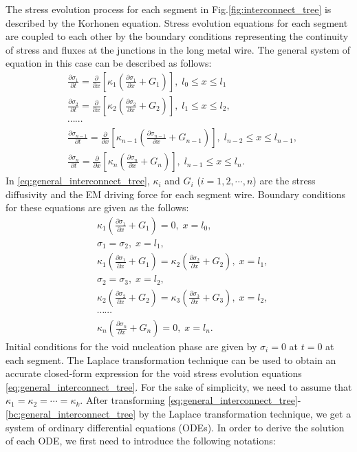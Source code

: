 The stress evolution process for each segment in Fig.\ref{fig:interconnect_tree} is described by the Korhonen equation. Stress evolution equations for each segment are coupled to each other by the boundary conditions representing the continuity of stress and fluxes at the junctions in the long metal wire. The general system of equation in this case can be described as follows:
\begin{equation} \label{eq:general_interconnect_tree}
\begin{split}
&\frac{\partial \sigma_1}{\partial t}=\frac{\partial }{\partial
x}[\kappa_1(\frac{\partial \sigma_1}{\partial x}+G_1)],\;l_0\leq x \leq l_1 \\
&\frac{\partial \sigma_2}{\partial t}=\frac{\partial }{\partial
x}[\kappa_2(\frac{\partial \sigma_2}{\partial
x}+G_2)],\;l_1\leq x \leq l_2, \\
&\cdots\cdots\\
&\frac{\partial \sigma_{n-1}}{\partial t}=\frac{\partial }{\partial
x}[\kappa_{n-1}(\frac{\partial \sigma_{n-1}}{\partial
x}+G_{n-1})],\;l_{n-2}\leq x \leq l_{n-1}, \\
&\frac{\partial \sigma_{n}}{\partial t}=\frac{\partial }{\partial
x}[\kappa_{n}(\frac{\partial \sigma_{n}}{\partial
x}+G_{n})],\;l_{n-1}\leq x \leq l_n.
 \end{split}
 \end{equation}
In \eqref{eq:general_interconnect_tree}, $\kappa_{i}$ and $G_i$ ($i=1,2,\cdots,n$) are the stress diffusivity and the EM driving force for each segment wire.
Boundary conditions for these equations are given as the follows:
 \begin{equation} \label{bc:general_interconnect_tree}
\begin{split}
&\kappa_1(\frac{\partial \sigma_1}{\partial x}+G_1)=0,\;x=l_0,\\
&\sigma_1=\sigma_2,\;x=l_1,\\
&\kappa_1(\frac{\partial \sigma_1}{\partial
x}+G_1)=\kappa_2(\frac{\partial \sigma_2}{\partial
x}+G_2),\;x=l_1,\\
&\sigma_2=\sigma_3,\;x=l_2,\\
&\kappa_2(\frac{\partial \sigma_2}{\partial
x}+G_2)=\kappa_3(\frac{\partial \sigma_3}{\partial
x}+G_3),\;x=l_2,\\
&\cdots\cdots \\
&\kappa_n(\frac{\partial \sigma_n}{\partial
x}+G_n)=0,\;x=l_n.
 \end{split}
 \end{equation}
Initial conditions for the void nucleation phase are given by $\sigma_i=0$ at $t=0$ at each segment. The Laplace transformation technique can be used to obtain an accurate closed-form expression for the void stress evolution equations \eqref{eq:general_interconnect_tree}. For the sake of simplicity, we need to assume that $\kappa_1=\kappa_2=\cdots=\kappa_k$. After transforming \eqref{eq:general_interconnect_tree}-\eqref{bc:general_interconnect_tree} by the Laplace transformation technique, we get a system of ordinary differential equations (ODEs). In order to derive the solution of each ODE, we first need to introduce the following notations:
